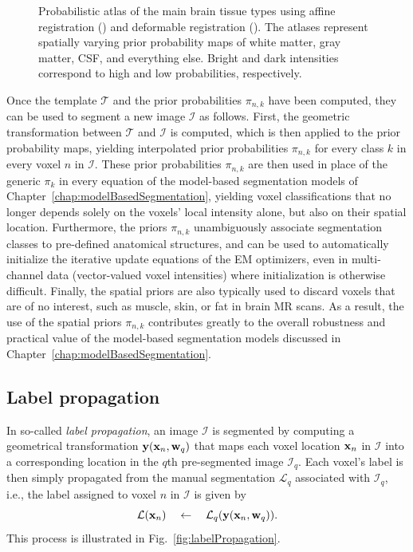 \documentclass[10pt,twoside]{book}
\begin{document}
\begin{figure}
\begin{subfigure}{0.64\textwidth}
    \caption{}
    \label{fig:probabilisticAtlas_b}
  \end{subfigure}
  \caption{Probabilistic atlas of the main brain tissue types using affine registration () and deformable registration (). The atlases represent spatially varying prior probability maps of white matter, gray matter, CSF, and everything else. Bright and dark intensities correspond to high and low probabilities, respectively.}
  \label{fig:probabilisticAtlas}
\end{figure}


Once the template $\mathcal{T}$ and the prior probabilities $\pi_{n,k}$ have been computed, they can be used to segment a new image
$\mathcal{I}$ as follows. First, the geometric transformation between $\mathcal{T}$ and $\mathcal{I}$ is computed, which is
then applied to the prior probability maps, yielding interpolated prior probabilities $\pi_{n,k}$ for every class $k$ in 
every voxel $n$ in $\mathcal{I}$. These prior probabilities $\pi_{n,k}$ are then used in place of the generic $\pi_k$ in every
equation of the model-based segmentation models of Chapter~\ref{chap:modelBasedSegmentation}, yielding voxel classifications 
that no longer depends solely on the voxels' local intensity alone, but also on their spatial location. Furthermore, the
priors $\pi_{n,k}$ 
unambiguously associate segmentation classes to pre-defined anatomical structures, and 
can be used to automatically initialize the iterative update equations of the EM optimizers, even in
multi-channel data (vector-valued voxel intensities) where initialization is otherwise difficult.
Finally, the spatial priors are also typically used to discard voxels that are of no interest, such as muscle, skin, or fat in brain MR scans. 
As a result, the use of the spatial
priors $\pi_{n,k}$ contributes greatly to the overall robustness and practical value of the model-based segmentation models discussed
in Chapter~\ref{chap:modelBasedSegmentation}.


\subsection{Label propagation}

In so-called \emph{label propagation}, an image $\mathcal{I}$ is segmented by computing a geometrical transformation
$\mathbf{y}(\mathbf{x}_n, \mathbf{w}_q)$ that maps each voxel location $\mathbf{x}_n$ in $\mathcal{I}$ into a corresponding location in
the $q$th pre-segmented image $\mathcal{I}_q$. Each voxel's label is then simply propagated from the manual segmentation $\mathcal{L}_q$ associated
with $\mathcal{I}_q$, i.e., the label assigned to voxel $n$ in $\mathcal{I}$ is given by
\begin{displaymath}
  \mathcal{L}( \mathbf{x}_n ) \quad \gets \quad  \mathcal{L}_q( \mathbf{y}( \mathbf{x}_n, \mathbf{w}_q ) ).
\end{displaymath}
This process is illustrated in Fig.~\ref{fig:labelPropagation}.
\end{document}
